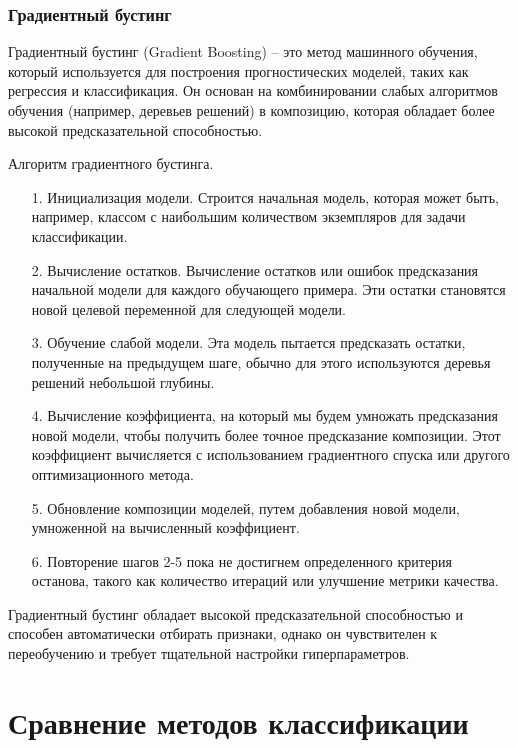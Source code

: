 \subsubsection*{Градиентный бустинг}

Градиентный бустинг (Gradient Boosting) -- это метод машинного обучения, который используется для построения прогностических моделей, таких как регрессия и классификация. Он основан на комбинировании слабых алгоритмов обучения (например, деревьев решений) в композицию, которая обладает более высокой предсказательной способностью.

Алгоритм градиентного бустинга.
\begin{itemize}[leftmargin=1.6\parindent]
	\item[1.] Инициализация модели. Строится начальная модель, которая может быть, например, классом с наибольшим количеством экземпляров для задачи классификации.
	\item[2.] Вычисление остатков. Вычисление остатков или ошибок предсказания начальной модели для каждого обучающего примера. Эти остатки становятся новой целевой переменной для следующей модели.
	\item[3.] Обучение слабой модели. Эта модель пытается предсказать остатки, полученные на предыдущем шаге, обычно для этого используются деревья решений небольшой глубины.
	\item[4.] Вычисление коэффициента, на который мы будем умножать предсказания новой модели, чтобы получить более точное предсказание композиции. Этот коэффициент вычисляется с использованием градиентного спуска или другого оптимизационного метода.
	\item[5.] Обновление композиции моделей, путем добавления новой модели, умноженной на вычисленный коэффициент.
	\item[6.] Повторение шагов 2-5 пока не достигнем определенного критерия останова, такого как количество итераций или улучшение метрики качества.
\end{itemize}

Градиентный бустинг обладает высокой предсказательной способностью и способен автоматически отбирать признаки, однако он чувствителен к переобучению и требует тщательной настройки гиперпараметров.


\section{Сравнение методов классификации}
